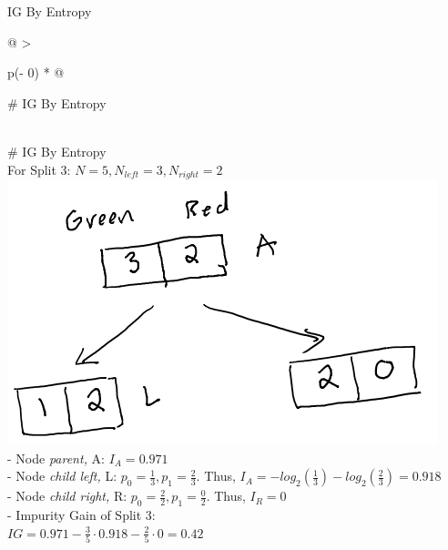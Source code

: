 \documentclass[
  ignorenonframetext,
]{beamer}
\begin{document}
\begin{frame}{IG By Entropy}
\begin{longtable}[]{@{}
  >{\raggedright\arraybackslash}p{(\columnwidth - 0\tabcolsep) * }@{}}
\toprule
\begin{minipage}[b]{\linewidth}\raggedright
\# IG By Entropy
\end{minipage} \\
\midrule
\endhead
\# IG By Entropy \\
For Split 3: \(N = 5, N_{left} =3, N_{right} = 2\) \\
\includegraphics{images/im2.png} \\
- Node \emph{parent,} A: \(I_{A} = 0.971\) \\
- Node \emph{child left,} L: \(p_0 = \frac{1}{3}, p_1 = \frac{2}{3}\).
Thus, \(I_{A} = -log_2(\frac{1}{3}) -log_2(\frac{2}{3}) = 0.918\) \\
- Node \emph{child right,} R: \(p_0 = \frac{2}{2}, p_1 = \frac{0}{2}\).
Thus, \(I_{R} = 0\) \\
- Impurity Gain of Split 3: \\
\(IG = 0.971 - \frac{3}{5} \cdot 0.918 - \frac{2}{5} \cdot 0 = 0.42\) \\
\bottomrule
\end{longtable}
\end{frame}
\end{document}
